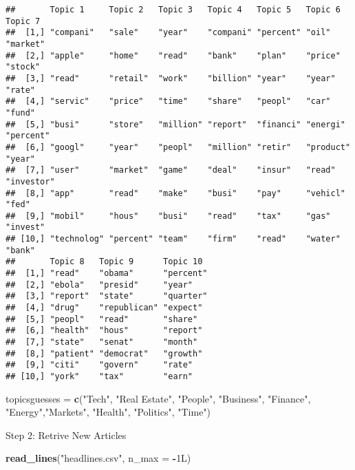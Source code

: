 \documentclass[
]{article}
\newenvironment{Shaded}{\begin{snugshade}}{\end{snugshade}}
\newcommand{\DataTypeTok}[1]{\textcolor[rgb]{0.13,0.29,0.53}{#1}}
\newcommand{\KeywordTok}[1]{\textcolor[rgb]{0.13,0.29,0.53}{\textbf{#1}}}
\newcommand{\NormalTok}[1]{#1}
\newcommand{\OperatorTok}[1]{\textcolor[rgb]{0.81,0.36,0.00}{\textbf{#1}}}
\newcommand{\StringTok}[1]{\textcolor[rgb]{0.31,0.60,0.02}{#1}}
\begin{document}
\begin{verbatim}
##       Topic 1     Topic 2   Topic 3   Topic 4   Topic 5   Topic 6   Topic 7   
##  [1,] "compani"   "sale"    "year"    "compani" "percent" "oil"     "market"  
##  [2,] "apple"     "home"    "read"    "bank"    "plan"    "price"   "stock"   
##  [3,] "read"      "retail"  "work"    "billion" "year"    "year"    "rate"    
##  [4,] "servic"    "price"   "time"    "share"   "peopl"   "car"     "fund"    
##  [5,] "busi"      "store"   "million" "report"  "financi" "energi"  "percent" 
##  [6,] "googl"     "year"    "peopl"   "million" "retir"   "product" "year"    
##  [7,] "user"      "market"  "game"    "deal"    "insur"   "read"    "investor"
##  [8,] "app"       "read"    "make"    "busi"    "pay"     "vehicl"  "fed"     
##  [9,] "mobil"     "hous"    "busi"    "read"    "tax"     "gas"     "invest"  
## [10,] "technolog" "percent" "team"    "firm"    "read"    "water"   "bank"    
##       Topic 8   Topic 9      Topic 10 
##  [1,] "read"    "obama"      "percent"
##  [2,] "ebola"   "presid"     "year"   
##  [3,] "report"  "state"      "quarter"
##  [4,] "drug"    "republican" "expect" 
##  [5,] "peopl"   "read"       "share"  
##  [6,] "health"  "hous"       "report" 
##  [7,] "state"   "senat"      "month"  
##  [8,] "patient" "democrat"   "growth" 
##  [9,] "citi"    "govern"     "rate"   
## [10,] "york"    "tax"        "earn"
\end{verbatim}

\begin{Shaded}
\begin{Highlighting}[]
\NormalTok{topicsguesses =}\StringTok{ }\KeywordTok{c}\NormalTok{(}\StringTok{"Tech"}\NormalTok{, }\StringTok{"Real Estate"}\NormalTok{, }\StringTok{"People"}\NormalTok{, }\StringTok{"Business"}\NormalTok{, }\StringTok{"Finance"}\NormalTok{, }\StringTok{"Energy"}\NormalTok{,}\StringTok{"Markets"}\NormalTok{, }\StringTok{"Health"}\NormalTok{, }\StringTok{"Politics"}\NormalTok{, }\StringTok{"Time"}\NormalTok{)}
\end{Highlighting}
\end{Shaded}

Step 2: Retrive New Articles

\begin{Shaded}
\begin{Highlighting}[]
\KeywordTok{read_lines}\NormalTok{(}\StringTok{"headlines.csv"}\NormalTok{, }\DataTypeTok{n_max =} \OperatorTok{-}\NormalTok{1L)}
\end{Highlighting}
\end{Shaded}
\end{document}
